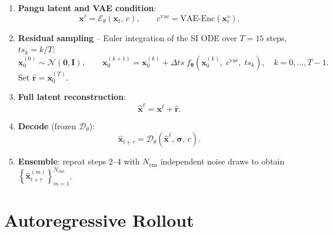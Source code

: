 \documentclass[11pt]{article}
\begin{document}
\begin{enumerate}
  \item \textbf{Pangu latent and VAE condition}:
        \begin{equation}
          \mathbf{x}^{\ell} = \mathcal{E}_\theta(\mathbf{x}_t,\,c),
          \qquad
          c^{\mathrm{vae}} = \mathrm{VAE\text{-}Enc}\!\left(\mathbf{x}_t^s\right).
        \end{equation}

  \item \textbf{Residual sampling} -- Euler integration of the SI ODE over
        $T=15$ steps, $ts_k = k/T$:
        \begin{equation}
          \mathbf{x}_0^{(0)} \sim \mathcal{N}(\mathbf{0},\mathbf{I}),
          \qquad
          \mathbf{x}_0^{(k+1)}
          = \mathbf{x}_0^{(k)}
          + \Delta ts\;
            f_{\bm{\theta}}\!\left(\mathbf{x}_0^{(k)},\;c^{\mathrm{vae}},\;ts_k\right),
          \quad k = 0,\ldots,T{-}1.
        \end{equation}
        Set $\hat{\mathbf{r}} = \mathbf{x}_0^{(T)}$.

  \item \textbf{Full latent reconstruction}:
        \begin{equation}
          \hat{\mathbf{x}}^{\ell}
          = \mathbf{x}^{\ell} + \hat{\mathbf{r}}.
        \end{equation}

  \item \textbf{Decode} (frozen $\mathcal{D}_\theta$):
        \begin{equation}
          \hat{\mathbf{x}}_{t+\tau}
          = \mathcal{D}_\theta\!\left(\hat{\mathbf{x}}^{\ell},\,\bm{\sigma},\,c\right).
        \end{equation}

  \item \textbf{Ensemble}: repeat steps 2--4 with $N_{\mathrm{ens}}$
        independent noise draws to obtain
        $\left\{\hat{\mathbf{x}}_{t+\tau}^{(m)}\right\}_{m=1}^{N_{\mathrm{ens}}}$.
\end{enumerate}

\section{Autoregressive Rollout}
\end{document}
